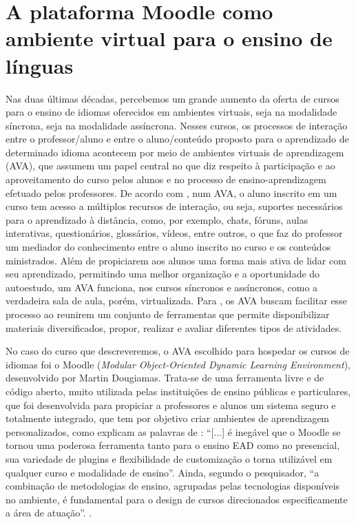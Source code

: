 \section{A plataforma Moodle como ambiente virtual para o ensino de línguas}\label{sec-aplataformamoodlecomoambientevirtualparaoensinodelínguas}

Nas duas últimas décadas, percebemos um grande aumento da oferta de
cursos para o ensino de idiomas oferecidos em ambientes virtuais, seja
na modalidade síncrona, seja na modalidade assíncrona. Nesses cursos, os
processos de interação entre o professor/aluno e entre o aluno/conteúdo
proposto para o aprendizado de determinado idioma acontecem por meio de
ambientes virtuais de aprendizagem (AVA), que assumem um papel central
no que diz respeito à participação e ao aproveitamento do curso pelos
alunos e no processo de ensino-aprendizagem efetuado pelos professores.
De acordo com \textcite{lima_https://proceedings.science/isa-2017/trabalhos/metodos-mais-usados-para-avaliacoes--ambientes-virtuais--aprendizagem-avas_2018}, num AVA, o aluno inscrito em um curso tem acesso a múltiplos recursos de interação, ou seja, suportes necessários para o aprendizado à distância, como, por exemplo, chats, fóruns, aulas interativas, questionários, glossários, vídeos, entre outros, o que faz do professor um mediador do conhecimento entre o aluno inscrito no curso e os conteúdos ministrados. Além de propiciarem aos alunos uma forma mais ativa de lidar com seu aprendizado, permitindo uma melhor organização e a oportunidade do autoestudo, um AVA funciona, nos cursos síncronos e assíncronos, como a verdadeira sala de aula, porém, virtualizada. Para \textcite{bersch_moodle_2009}, os AVA buscam facilitar esse processo ao reunirem um conjunto de ferramentas que permite disponibilizar materiais diversificados, propor, realizar e avaliar diferentes tipos de atividades.

No caso do curso que descreveremos, o AVA escolhido para hospedar os
cursos de idiomas foi o Moodle (\emph{Modular Object-Oriented Dynamic
	Learning Environment}), desenvolvido por Martin Dougiamas. Trata-se de
uma ferramenta livre e de código aberto, muito utilizada pelas
instituições de ensino públicas e particulares, que foi desenvolvida
para propiciar a professores e alunos um sistema seguro e totalmente
integrado, que tem por objetivo criar ambientes de aprendizagem
personalizados, como explicam as palavras de \textcite[p. 31]{gervasio_nvestigacao_2019}:
\enquote{[$\ldots$] é inegável que o Moodle se tornou uma poderosa ferramenta
tanto para o ensino EAD como no presencial, sua variedade de plugins e
flexibilidade de customização o torna utilizável em qualquer curso e
modalidade de ensino}. Ainda, segundo o pesquisador, \enquote{a combinação de
metodologias de ensino, agrupadas pelas tecnologias disponíveis no
ambiente, é fundamental para o design de cursos direcionados
especificamente a área de atuação}. \cite[p. 31]{gervasio_nvestigacao_2019}.

